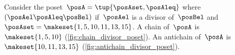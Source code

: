 \vspace{5cm}

\begin{marginfigure}
    \centering
    \caption{}
    \label{fig:chain_divisor_poset}
\end{marginfigure}

\begin{marginfigure}
    \centering
    \caption{}
    \label{fig:antichain_divisor_poset}
\end{marginfigure}

\begin{example}
    Consider the poset~$\posA=\tup{\posAset,\posAleq}$ where~$(\posAel \posAleq \posBel)$ if~$\posAel$ is a divisor of~$\posBel$ and~$\posAset=\makeset{1,5,10,11,13,15}$.
    A chain of~$\posA$ is~$\makeset{1,5,10}$ (\cref{fig:chain_divisor_poset}).
    An antichain of~$\posA$ is~$\makeset{10,11,13,15}$ (\cref{fig:antichain_divisor_poset}).
\end{example}

